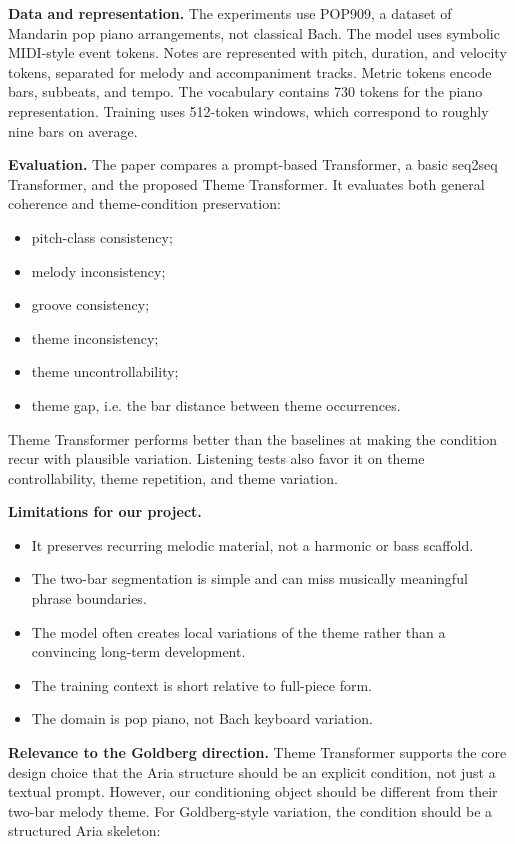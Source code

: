 \documentclass[11pt]{article}
\begin{document}
\textbf{Data and representation.}
The experiments use POP909, a dataset of Mandarin pop piano arrangements, not
classical Bach. The model uses symbolic MIDI-style event tokens. Notes are
represented with pitch, duration, and velocity tokens, separated for melody and
accompaniment tracks. Metric tokens encode bars, subbeats, and tempo. The
vocabulary contains 730 tokens for the piano representation. Training uses
512-token windows, which correspond to roughly nine bars on average.

\textbf{Evaluation.}
The paper compares a prompt-based Transformer, a basic seq2seq Transformer, and
the proposed Theme Transformer. It evaluates both general coherence and
theme-condition preservation:

\begin{itemize}[leftmargin=*]
  \item pitch-class consistency;
  \item melody inconsistency;
  \item groove consistency;
  \item theme inconsistency;
  \item theme uncontrollability;
  \item theme gap, i.e. the bar distance between theme occurrences.
\end{itemize}

Theme Transformer performs better than the baselines at making the condition
recur with plausible variation. Listening tests also favor it on theme
controllability, theme repetition, and theme variation.

\textbf{Limitations for our project.}
\begin{itemize}[leftmargin=*]
  \item It preserves recurring melodic material, not a harmonic or bass
  scaffold.
  \item The two-bar segmentation is simple and can miss musically meaningful
  phrase boundaries.
  \item The model often creates local variations of the theme rather than a
  convincing long-term development.
  \item The training context is short relative to full-piece form.
  \item The domain is pop piano, not Bach keyboard variation.
\end{itemize}

\textbf{Relevance to the Goldberg direction.}
Theme Transformer supports the core design choice that the Aria structure should
be an explicit condition, not just a textual prompt. However, our conditioning
object should be different from their two-bar melody theme. For Goldberg-style
variation, the condition should be a structured Aria skeleton:
\end{document}
